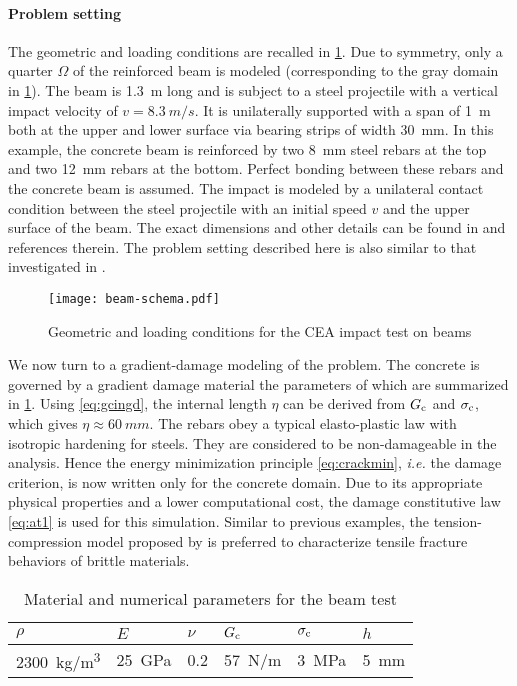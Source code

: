 \paragraph{Problem setting} The geometric and loading conditions are recalled in \cref{fig:beam}. Due to symmetry, only a quarter $\Omega$ of the reinforced beam is modeled (corresponding to the gray domain in \cref{fig:beam}). The beam is \SI{1.3}{m} long and is subject to a steel projectile with a vertical impact velocity of $v=\SI{8.3}{m/s}$. It is unilaterally supported with a span of \SI{1}{m} both at the upper and lower surface via bearing strips of width \SI{30}{mm}. In this example, the concrete beam is reinforced by two \SI{8}{mm} steel rebars at the top and two \SI{12}{mm} rebars at the bottom. Perfect bonding between these rebars and the concrete beam is assumed. The impact is modeled by a unilateral contact condition between the steel projectile with an initial speed $v$ and the upper surface of the beam. The exact dimensions and other details can be found in \cite{Guilbaud:2015} and references therein. The problem setting described here is also similar to that investigated in \cite{OzboltSharma:2011,AdhikaryLiFujikake:2012}.
\begin{figure}[htbp]
\centering
\texttt{[image: beam-schema.pdf]}
\caption{Geometric and loading conditions for the CEA impact test on beams} \label{fig:beam}
\end{figure}

We now turn to a gradient-damage modeling of the problem. The concrete is governed by a gradient damage material the parameters of which are summarized in \cref{tab:beamconcrete}. Using \eqref{eq:gcingd}, the internal length $\eta$ can be derived from $G_\mathrm{c}$ and $\sigma_{\mathrm{c}}$, which gives $\eta\approx \SI{60}{mm}$. The rebars obey a typical elasto-plastic law with isotropic hardening for steels. They are considered to be non-damageable in the analysis. Hence the energy minimization principle \eqref{eq:crackmin}, \emph{i.e.} the damage criterion, is now written only for the concrete domain. Due to its appropriate physical properties and a lower computational cost, the damage constitutive law \eqref{eq:at1} is used for this simulation. Similar to previous examples, the tension-compression model proposed by \cite{FreddiRoyer-Carfagni:2010} is preferred to characterize tensile fracture behaviors of brittle materials.
\begin{table}[htbp]
\centering
\caption{Material and numerical parameters for the beam test} \label{tab:beamconcrete}
\begin{tabular}{llllll} \toprule
$\rho$ & $E$ & $\nu$ & $G_\mathrm{c}$ & $\sigma_{\mathrm{c}}$ & $h$ \\ \midrule
\SI{2300}{kg/m^3} & \SI{25}{GPa} & 0.2 & \SI{57}{N/m} & \SI{3}{MPa} & \SI{5}{mm} \\ \bottomrule
\end{tabular}
\end{table}

